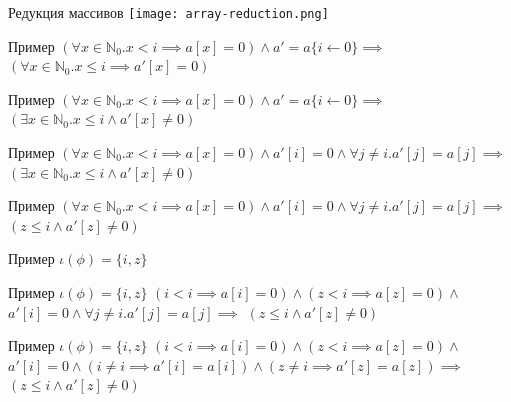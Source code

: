 \documentclass{beamer}
\begin{document}
\begin{frame}{Редукция массивов}
\texttt{[image: array-reduction.png]}
\end{frame}

\begin{frame}{Пример}
$(\forall x \in \mathbb{N}_0. x < i \implies a[x] = 0) \wedge a' = a\{i\leftarrow 0\} \implies$\newline
$(\forall x \in \mathbb{N}_0. x \le i \implies a'[x] = 0)$
\end{frame}

\begin{frame}{Пример}
$(\forall x \in \mathbb{N}_0. x < i \implies a[x] = 0) \wedge a' = a\{i\leftarrow 0\} \implies$\newline
$(\exists x \in \mathbb{N}_0. x \le i \wedge a'[x] \ne 0)$
\end{frame}

\begin{frame}{Пример}
$(\forall x \in \mathbb{N}_0. x < i \implies a[x] = 0) \wedge a'[i] = 0 \wedge \forall j \ne i. a'[j] = a[j] \implies$\newline
$(\exists x \in \mathbb{N}_0. x \le i \wedge a'[x] \ne 0)$
\end{frame}

\begin{frame}{Пример}
$(\forall x \in \mathbb{N}_0. x < i \implies a[x] = 0) \wedge a'[i] = 0 \wedge \forall j \ne i. a'[j] = a[j] \implies$\newline
$(z \le i \wedge a'[z] \ne 0)$
\end{frame}

\begin{frame}{Пример}
$\iota(\phi) = \{i, z\}$
\end{frame}

\begin{frame}{Пример}
$\iota(\phi) = \{i, z\}$\newline
$(i < i \implies a[i] = 0) \wedge (z < i \implies a[z] = 0) \wedge$\newline
$a'[i] = 0 \wedge \forall j \ne i. a'[j] = a[j] \implies$\newline
$(z \le i \wedge a'[z] \ne 0)$
\end{frame}

\begin{frame}{Пример}
$\iota(\phi) = \{i, z\}$\newline
$(i < i \implies a[i] = 0) \wedge (z < i \implies a[z] = 0) \wedge$\newline
$a'[i] = 0 \wedge (i \ne i \implies a'[i] = a[i]) \wedge (z \ne i \implies a'[z] = a[z])\implies$\newline
$(z \le i \wedge a'[z] \ne 0)$
\end{frame}
\end{document}

